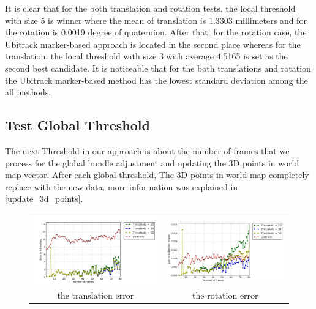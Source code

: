 It is clear that for the both translation and rotation tests, the local threshold with size 5 is winner where the mean of translation is 1.3303 millimeters and for the rotation is 0.0019 degree of quaternion. After that, for the rotation case, the Ubitrack marker-based approach is located in the second place whereas for the translation, the local threshold with size 3 with average 4.5165 is set as the second best candidate. It is noticeable that for the both translations and rotation the Ubitrack marker-based method has the lowest standard deviation among the all methods.

\subsection{Test Global Threshold}
The next Threshold in our approach is about the number of frames that we process for the global bundle adjustment and updating the 3D points in world map vector. After each global threshold, The 3D points in world map completely replace with the new data. more information was explained in \autoref{update_3d_points}.
\begin{figure}[H]
\centering
\begin{tabular}{cc}
  \includegraphics[width=80mm]{figures/global/graph_translation} &   \includegraphics[width=80mm]{figures/global/graph_rotation}  \\
  the translation error & the rotation error \\[6pt]
\end{tabular}
\caption{}\label{fig:test_global_threshold}

\end{figure}
